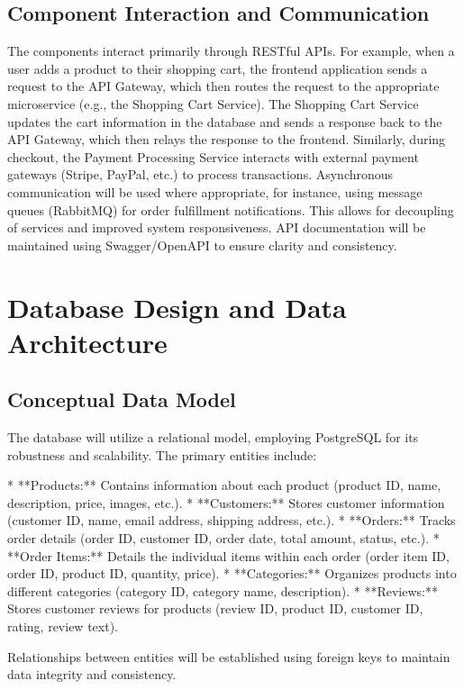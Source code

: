 \documentclass[11pt,a4paper,oneside]{article}
\begin{document}
\subsection{Component Interaction and Communication}

The components interact primarily through RESTful APIs.  For example, when a user adds a product to their shopping cart, the frontend application sends a request to the API Gateway, which then routes the request to the appropriate microservice (e.g., the Shopping Cart Service).  The Shopping Cart Service updates the cart information in the database and sends a response back to the API Gateway, which then relays the response to the frontend.  Similarly, during checkout, the Payment Processing Service interacts with external payment gateways (Stripe, PayPal, etc.) to process transactions.  Asynchronous communication will be used where appropriate, for instance, using message queues (RabbitMQ) for order fulfillment notifications.  This allows for decoupling of services and improved system responsiveness.  API documentation will be maintained using Swagger/OpenAPI to ensure clarity and consistency.

\section{Database Design and Data Architecture}

\subsection{Conceptual Data Model}

The database will utilize a relational model, employing PostgreSQL for its robustness and scalability.  The primary entities include:

* **Products:**  Contains information about each product (product ID, name, description, price, images, etc.).
* **Customers:** Stores customer information (customer ID, name, email address, shipping address, etc.).
* **Orders:**  Tracks order details (order ID, customer ID, order date, total amount, status, etc.).
* **Order Items:**  Details the individual items within each order (order item ID, order ID, product ID, quantity, price).
* **Categories:**  Organizes products into different categories (category ID, category name, description).
* **Reviews:** Stores customer reviews for products (review ID, product ID, customer ID, rating, review text).

Relationships between entities will be established using foreign keys to maintain data integrity and consistency.
\end{document}
